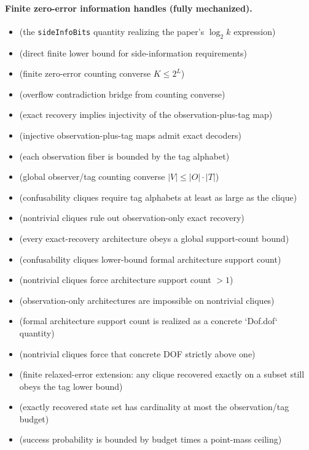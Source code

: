 \paragraph{Finite zero-error information handles (fully mechanized).}
\begin{itemize}
\item {} (the \texttt{sideInfoBits} quantity realizing the paper's $\log_2 k$ expression)
\item {} (direct finite lower bound for side-information requirements)
\item {} (finite zero-error counting converse $K \le 2^L$)
\item {} (overflow contradiction bridge from counting converse)
\item {} (exact recovery implies injectivity of the observation-plus-tag map)
\item {} (injective observation-plus-tag maps admit exact decoders)
\item {} (each observation fiber is bounded by the tag alphabet)
\item {} (global observer/tag counting converse $|V|\le |O|\cdot |T|$)
\item {} (confusability cliques require tag alphabets at least as large as the clique)
\item {} (nontrivial cliques rule out observation-only exact recovery)
\item {} (every exact-recovery architecture obeys a global support-count bound)
\item {} (confusability cliques lower-bound formal architecture support count)
\item {} (nontrivial cliques force architecture support count $>1$)
\item {} (observation-only architectures are impossible on nontrivial cliques)
\item {} (formal architecture support count is realized as a concrete `Dof.dof` quantity)
\item {} (nontrivial cliques force that concrete DOF strictly above one)
\item {} (finite relaxed-error extension: any clique recovered exactly on a subset still obeys the tag lower bound)
\item {} (exactly recovered state set has cardinality at most the observation/tag budget)
\item {} (success probability is bounded by budget times a point-mass ceiling)

\end{itemize}
